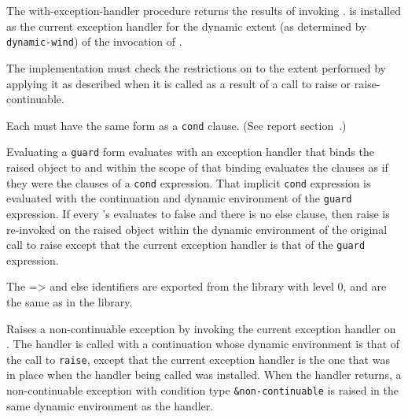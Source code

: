 \begin{entry}{%
}

  The {\cf
with-exception-handler} procedure returns the results of invoking
.   is installed as the current
exception handler for the dynamic extent (as determined by {\tt
  dynamic-wind}) of the invocation of .

\implresp The implementation must check the restrictions on
 to the extent performed by applying it as described
when it is called as a result of a call to {\cf raise} or {\cf
  raise-continuable}.
\end{entry}

\begin{entry}{%
}

\syntax
Each  must have the same form as a {\tt cond} clause.
(See report section~.)

\semantics 
Evaluating a {\tt guard} form evaluates  with an exception
handler that binds the raised object to  and within the scope of
that binding evaluates the clauses as if they were the clauses of a
{\tt cond} expression. That implicit {\tt cond} expression is evaluated with the
continuation and dynamic environment of the {\tt guard} expression. If every
's  evaluates to false and there is no else clause, then
{\cf raise} is re-invoked on the raised object within the dynamic
environment of the original call to raise except that the current
exception handler is that of the {\tt guard} expression.  

The {\cf =>} and {\cf else} identifiers are exported from the
 library with level $0$, and are the same as
in the  library.
\end{entry}

\begin{entry}{%
}

Raises a non-continuable exception by invoking the current exception
handler on . The handler is called with a continuation whose
dynamic environment is that of the call to {\tt raise}, except that
the current exception handler is the one that was in place when the handler being
called was installed.  When the handler returns, a non-continuable
exception with condition type {\tt \&non-continuable} is raised in the
same dynamic environment as the handler.
\end{entry}

